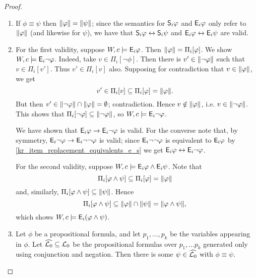 \begin{proof}\leavevmode
\begin{enumerate}
    \item
        If $\phi \equiv \psi$ then $\propmods{\phi} = \propmods{\psi}$; since
        the semantics for $\S_i\phi$ and $\E_i\phi$ only refer to
        $\propmods{\phi}$ (and likewise for $\psi$), we have that $\S_i\phi
        \liff \S_i\psi$ and $\E_i\phi \liff \E_i\psi$
        are valid.

    \item
        For the first validity, suppose $W, c \models \E_i\phi$. Then
        $\propmods{\phi} = \Pi_i[\phi]$. We show $W, c \models \E_i\neg\phi$.
        Indeed, take $v \in \Pi_i[\neg\phi]$. Then there is $v' \in
        \propmods{\neg\phi}$ such that $v \in \Pi_i[v']$. Thus $v' \in
        \Pi_i[v]$ also. Supposing for contradiction that $v \in
        \propmods{\phi}$, we get
        \[
            v' \in \Pi_i[v] \subseteq \Pi_i[\phi] = \propmods{\phi}.
        \]
        But then $v' \in \propmods{\neg\phi} \cap \propmods{\phi} = \emptyset$;
        contradiction. Hence $v \notin \propmods{\phi}$, i.e. $v \in
        \propmods{\neg\phi}$. This shows that $\Pi_i[\neg\phi] \subseteq
        \propmods{\neg\phi}$, so $W, c \models \E_i\neg\phi$.

        We have shown that $\E_i\phi \limplies \E_i\neg\phi$ is valid. For
        the converse note that, by symmetry, $\E_i\neg\phi \limplies
        \E_i\neg\neg\phi$ is valid; since $\E_i\neg\neg\phi$ is equivalent to
        $\E_i\phi$ by \cref{kr_item_replacement_equivalents_e_s} we get
        $\E_i\phi \liff \E_i\neg\phi$.

        For the second validity, suppose $W, c \models \E_i\phi \land
        \E_i\psi$. Note that
        \[
            \Pi_i[\phi \land \psi]
            \subseteq \Pi_i[\phi]
            = \propmods{\phi}
        \]
        and, similarly, $\Pi_i[\phi \land \psi] \subseteq \propmods{\psi}$.
        Hence
        \[
            \Pi_i[\phi \land \psi]
            \subseteq \propmods{\phi} \cap \propmods{\psi}
            = \propmods{\phi \land \psi},
        \]
        which shows $W, c \models \E_i(\phi \land \psi)$.

    \item
        Let $\phi$ be a propositional formula, and let $p_1, \ldots, p_k$ be
        the variables appearing in $\phi$. Let $\widehat{\lprop} \subseteq
        \lprop$ be the propositional formulas over $p_1, \ldots p_k$ generated
        only using conjunction and negation. Then there is some $\psi \in
        \widehat{\lprop}$ with $\phi \equiv \psi$.


\end{enumerate}
\end{proof}
